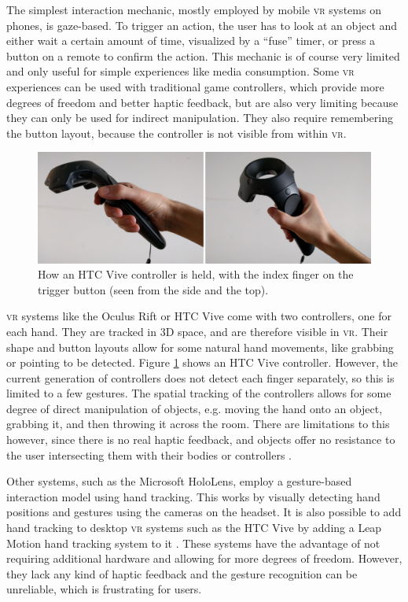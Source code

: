 \documentclass[nobib]{tufte-book} %
\begin{document}
The simplest interaction mechanic, mostly employed by mobile \textsc{vr} systems on phones, is gaze-based. To trigger an action, the user has to look at an object and either wait a certain amount of time, visualized by a ``fuse'' timer, or press a button on a remote to confirm the action. This mechanic is of course very limited and only useful for simple experiences like media consumption. Some \textsc{vr} experiences can be used with traditional game controllers, which provide more degrees of freedom and better haptic feedback, but are also very limiting because they can only be used for indirect manipulation. They also require remembering the button layout, because the controller is not visible from within \textsc{vr}.

\begin{figure}
  \includegraphics{vive-controller.png}
  \caption{How an HTC Vive controller is held, with the index finger on the trigger button (seen from the side and the top).}
  \label{fig:vive-controller}
\end{figure}

\textsc{vr} systems like the Oculus Rift or HTC Vive come with two controllers, one for each hand. They are tracked in 3D space, and are therefore visible in \textsc{vr}. Their shape and button layouts allow for some natural hand movements, like grabbing or pointing to be detected. Figure \ref{fig:vive-controller} shows an HTC Vive controller. However, the current generation of controllers does not detect each finger separately, so this is limited to a few gestures. The spatial tracking of the controllers allows for some degree of direct manipulation of objects, e.g. moving the hand onto an object, grabbing it, and then throwing it across the room. There are limitations to this however, since there is no real haptic feedback, and objects offer no resistance to the user intersecting them with their bodies or controllers \cite{sanchez2005presence}.

Other systems, such as the Microsoft HoloLens, employ a gesture-based interaction model using hand tracking. This works by visually detecting hand positions and gestures using the cameras on the headset. It is also possible to add hand tracking to desktop \textsc{vr} systems such as the HTC Vive by adding a Leap Motion hand tracking system to it \cite[-1cm]{wozniak2016possible}. These systems have the advantage of not requiring additional hardware and allowing for more degrees of freedom. However, they lack any kind of haptic feedback and the gesture recognition can be unreliable, which is frustrating for users.
\end{document}
